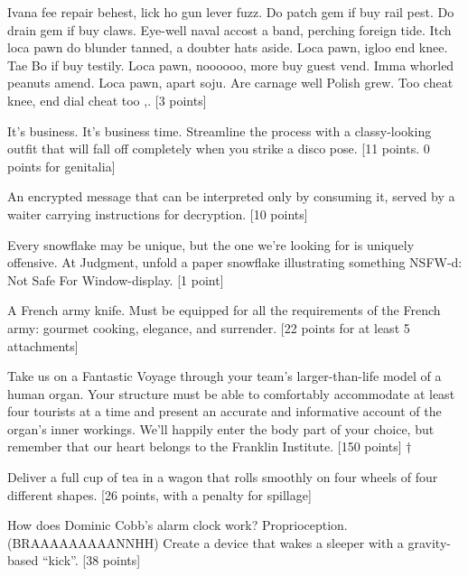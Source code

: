 \documentclass{book}
\begin{document}
\begin{list}{}{}
\item Ivana fee repair behest, lick ho gun lever fuzz. Do patch gem if buy rail pest. Do drain gem if buy claws. Eye-well naval accost a band, perching foreign tide. Itch loca pawn do blunder tanned, a doubter hats aside. Loca pawn, igloo end knee. Tae Bo if buy testily. Loca pawn, noooooo, more buy guest vend. Imma whorled peanuts amend. Loca pawn, apart soju. Are carnage well Polish grew. Too cheat knee, end dial cheat too \underline{\hspace{2.0 in}},\underline{\hspace{1.5 in}}. [3 points]

\item It's business. It's business time. Streamline the process with a classy-looking outfit that will fall off completely when you strike a disco pose.  [11 points. 0 points for genitalia]

\item An encrypted message that can be interpreted only by consuming it, served by a waiter carrying instructions for decryption. [10 points]

\item Every snowflake may be unique, but the one we're looking for is uniquely offensive. At Judgment, unfold a paper snowflake illustrating something NSFW-d: Not Safe For Window-display. [1 point]

\item A French army knife. Must be equipped for all the requirements of the French army: gourmet cooking, elegance, and surrender. [22 points for at least 5 attachments]

\item Take us on a Fantastic Voyage through your team's larger-than-life model of a human organ. Your structure must be able to comfortably accommodate at least four tourists at a time and present an accurate and informative account of the organ's inner workings. We'll happily enter the body part of your choice, but remember that our heart belongs to the Franklin Institute. [150 points] $\dagger$ 

\item Deliver a full cup of tea in a wagon that rolls smoothly on four wheels of four different shapes. [26 points, with a penalty for spillage]

\item How does Dominic Cobb's alarm clock work? Proprioception. (BRAAAAAAAAANNHH) Create a device that wakes a sleeper with a gravity-based ``kick''. [38 points]


\end{list}
\end{document}
